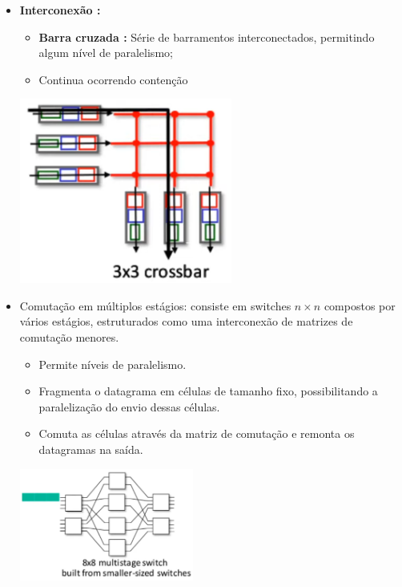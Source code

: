 \begin{itemize}[left=0.5cm, align=left, nosep]
                \item \textbf{Interconexão :} 
                    \begin{itemize}[left=0.5cm, nosep, label=$\hookrightarrow$]
                        \item \textbf{Barra cruzada :} Série de barramentos interconectados, permitindo algum nível de paralelismo; 
                        \item Continua ocorrendo contenção
                    \end{itemize}
                     
                    \begin{center}
                        \includegraphics[width=0.55\textwidth]{img/cap-04/barra-cruzada.png}
                    \end{center}

                \item Comutação em múltiplos estágios: consiste em switches \(n \times n\) compostos por vários estágios, estruturados como uma interconexão de matrizes de comutação menores. 
                    \begin{itemize}[left=0.5cm, nosep, label=$\hookrightarrow$]
                        \item Permite níveis de paralelismo. 
                        \item Fragmenta o datagrama em células de tamanho fixo, possibilitando a paralelização do envio dessas células.
                        \item Comuta as células através da matriz de comutação e remonta os datagramas na saída.
                    \end{itemize}
                     
                    \begin{center}
                        \includegraphics[width=0.45\textwidth]{img/cap-04/comutacao-em-multiplos-estagios.png}
                    \end{center}


\end{itemize}
